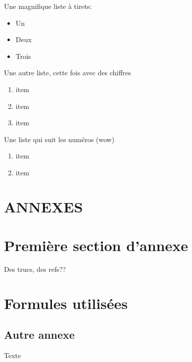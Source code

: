 \documentclass{article}[letterpaper, 11pt]
\begin{document}
Une magnifique liste à tirets:
\begin{itemize}[label={--}]
	\item Un
	\item Deux
	\item Trois
\end{itemize}
Une autre liste, cette fois avec des chiffres
\begin{enumerate}[label={E\arabic*.}]
	\item item
	\item item
	\item item
\end{enumerate}

Une liste qui suit les numéros (wow)

\begin{enumerate}[label={E\arabic*.}, resume]
	\item item
	\item item
\end{enumerate}

\newpage
\section*{ANNEXES}

\setcounter{section}{0}
\renewcommand{\thesection}{\Alph{section}}
\section{Première section d'annexe}
Des trucs, des refs??

\newpage
\section{Formules utilisées}\label{sec:truc}
\subsection{Autre annexe}
Texte
\end{document}
